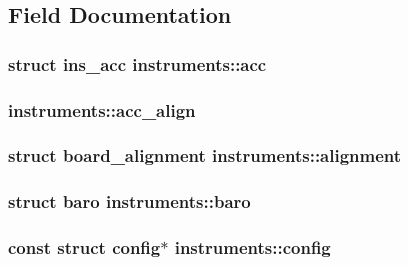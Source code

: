 \subsection{Field Documentation}
\hypertarget{structinstruments_a1c8aac13bfd266162b6be1a41f4c7713}{
\subsubsection[{acc}]{\setlength{\rightskip}{0pt plus 5cm}struct {\bf ins\+\_\+acc} instruments\+::acc}}\label{structinstruments_a1c8aac13bfd266162b6be1a41f4c7713}
\hypertarget{structinstruments_a18bdeeda911eb111cea51d78e969f939}{
\subsubsection[{acc\+\_\+align}]{ instruments\+::acc\+\_\+align}}\label{structinstruments_a18bdeeda911eb111cea51d78e969f939}
\hypertarget{structinstruments_ae04c11ada8646187deec24ed2bfb593c}{
\subsubsection[{alignment}]{\setlength{\rightskip}{0pt plus 5cm}struct {\bf board\+\_\+alignment} instruments\+::alignment}}\label{structinstruments_ae04c11ada8646187deec24ed2bfb593c}
\hypertarget{structinstruments_ae29ba41c78afd38395236fe2465994a7}{
\subsubsection[{baro}]{\setlength{\rightskip}{0pt plus 5cm}struct {\bf baro} instruments\+::baro}}\label{structinstruments_ae29ba41c78afd38395236fe2465994a7}
\hypertarget{structinstruments_a215fcb8b7f6d84b423556162d2e7cbd3}{
\subsubsection[{config}]{\setlength{\rightskip}{0pt plus 5cm}const struct {\bf config}$\ast$ instruments\+::config}}\label{structinstruments_a215fcb8b7f6d84b423556162d2e7cbd3}
